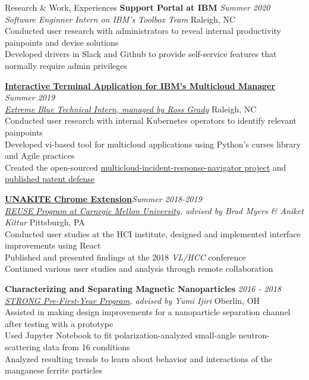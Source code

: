 \documentclass{resume}
\begin{document}
\begin{rSection}{Research \& Work, Experiences}
{\bf Support Portal at IBM} \hfill  {\em Summer 2020} \\
{\it Software Enginner Intern on IBM's Toolbox Team} \hfill { Raleigh, NC} \\
{Conducted user research with administrators to reveal internal productivity painpoints and devise solutions} \\
{Developed drivers in Slack and Github to provide self-service features that normally require admin privileges}

\href{https://github.com/IBM/multicloud-incident-response-navigator}{\bf Interactive Terminal Application for IBM's Multicloud Manager} \hfill  {\em Summer 2019} \\
\href{https://www.ibm.com/employment/extremeblue/index.html}{\em Extreme Blue Technical Intern, managed by Ross Grady} \hfill { Raleigh, NC} \\
{Conducted user research with internal Kubernetes operators to identify relevant painpoints} \\
Developed vi-based tool for multicloud applications using Python's curses library and Agile practices \\
{Created the open-sourced \href{https://github.com/IBM/multicloud-incident-response-navigator}{multicloud-incident-response-navigator project}} and \href{https://priorart.ip.com/IPCOM/000262660}{published patent defense}

{\bf \href{https://unakite.info/}{UNAKITE Chrome Extension}}\hfill {\em Summer 2018-2019} \\
{\em \href{https://www.cmu.edu/scs/isr/reuse/}{REUSE Program at Carnegie Mellon University}, advised by Brad Myers \& Aniket Kittur} \hfill { Pittsburgh, PA}\\
Conducted user studies at the HCI institute, designed and implemented interface improvements using React \\
Published and presented findings at the 2018 {\em VL/HCC} conference \\
Continued various user studies and analysis through remote collaboration

{\bf Characterizing and Separating Magnetic Nanoparticles } \hfill {\em 2016 - 2018}\\
{\em \href{https://www.oberlin.edu/undergraduate-research/programs/strong}{STRONG Pre-First-Year Program}, advised by Yumi Ijiri } \hfill { Oberlin, OH}\\
Assisted in making design improvements for a nanoparticle separation channel after testing with a prototype \\
Used Jupyter Notebook to fit polarization-analyzed small-angle neutron-scattering data from 16 conditions \\
Analyzed resulting trends to learn about behavior and interactions of the manganese ferrite particles 


\end{rSection}
\end{document}
